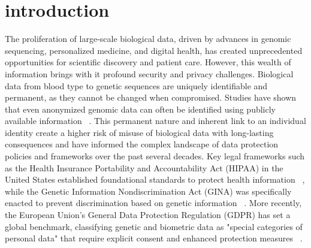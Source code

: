 \documentclass[conference]{IEEEtran}
\begin{document}
\section{\textbf{introduction}}
\label{int}
The proliferation of large-scale biological data, driven by advances in genomic sequencing, personalized medicine, and digital health, has created unprecedented opportunities for scientific discovery and patient care. However, this wealth of information brings with it profound security and privacy challenges. Biological data from blood type to genetic sequences are uniquely identifiable and permanent, as they cannot be changed when compromised. Studies have shown that even anonymized genomic data can often be identified using publicly available information ~\cite{gymrek2013identifying}. This permanent nature and inherent link to an individual identity create a higher risk of misuse of biological data with long-lasting consequences and have informed the complex landscape of data protection policies and frameworks over the past several decades. Key legal frameworks such as the Health Insurance Portability and Accountability Act (HIPAA) in the United States established foundational standards to protect health information ~\cite{hhs_hipaa_security_rule}, while the Genetic Information Nondiscrimination Act (GINA) was specifically enacted to prevent discrimination based on genetic information ~\cite{NHGRI_GINA}. More recently, the European Union's General Data Protection Regulation (GDPR) has set a global benchmark, classifying genetic and biometric data as "special categories of personal data" that require explicit consent and enhanced protection measures ~\cite{EU_GDPR}.
\end{document}
